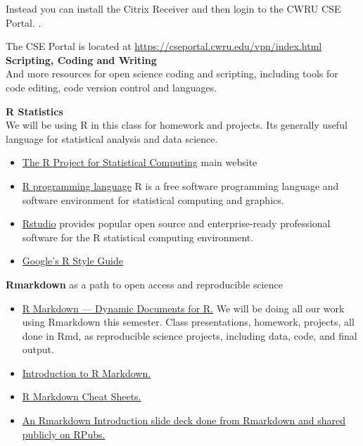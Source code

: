 \documentclass[10pt]{article} %
\begin{document}
  Instead you can install the Citrix Receiver \cite{citrix_citrix_2014} and then login to the CWRU CSE Portal. \cite{cse_portal_cwru_2014}.

  The CSE Portal is located at \href{"https://cseportal.cwru.edu/vpn/index.html"}{https://cseportal.cwru.edu/vpn/index.html}    \\

  {\bf Scripting, Coding and Writing} \\
  And more resources for open science coding and scripting, including tools for code editing, code version control and languages.

  {\bf R Statistics} \\
    We will be using R in this class for homework and projects.
    Its generally useful language for statistical analysis and data science.
    \begin{itemize}
    	\item \href{"http://www.r-project.org/index.html"}{The R Project for Statistical Computing}  \cite{r_r_2014} main website
    	\item \href{"http://en.wikipedia.org/wiki/R_(programming_language)"}{R programming language}  R is a free software programming language and software environment for statistical computing and graphics.\cite{r_project_r_2014}
    	\item \href{"http://www.rstudio.com/"}{Rstudio} provides popular open source and enterprise-ready professional software for the R statistical computing environment.  \cite{rstudio_rstudio_2014}
    	\item \href{"https://google-styleguide.googlecode.com/svn/trunk/Rguide.xml"}{ Google's R Style Guide}
    \end{itemize}

  {\bf Rmarkdown} as a path to open access and reproducible science
    \begin{itemize}
    	\item \href{"http://rmarkdown.rstudio.com/"}{ R Markdown — Dynamic Documents for R.} We will be doing all our work using Rmarkdown this semester. Class presentations, homework, projects, all done in Rmd, as reproducible science projects, including data, code, and final output.
    	\item \href{"http://shiny.rstudio.com/articles/rmarkdown.html"}{ Introduction to R Markdown. }
    	\item \href{"http://www.rstudio.com/resources/cheatsheets/"}{ R Markdown Cheat Sheets. }
    	\item \href{"http://rpubs.com/mansun_kuo/24330"}{ An Rmarkdown Introduction slide deck done from Rmarkdown and shared publicly on RPubs. }
    \end{itemize}
\end{document}
